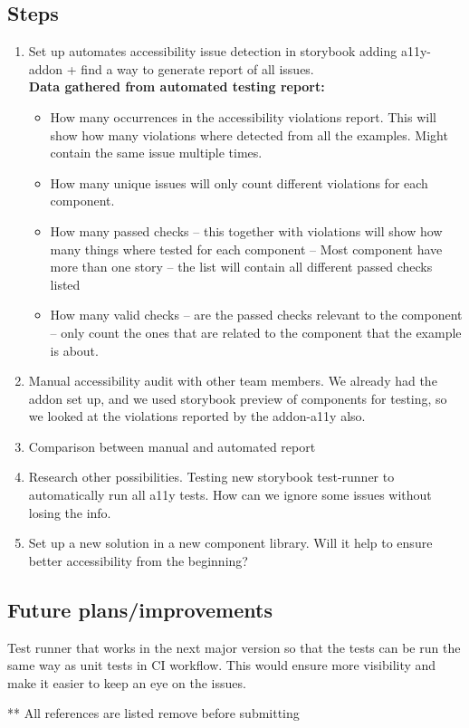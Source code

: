 \documentclass{master_thesis}
\begin{document}
\subsection{Steps}
\begin{enumerate}
	\item Set up automates accessibility issue detection in storybook
	adding a11y-addon + find a way to generate report of all issues. \\
	\textbf{Data gathered from automated testing report:}
	\begin{itemize}
		\item How many occurrences in the accessibility violations report. This will show how many violations where detected from all the examples. Might contain the same issue multiple times.
		\item How many unique issues will only count different violations for each component.
		\item How many passed checks – this together with violations will show how many things where tested for each component – Most component have more than one story – the list will contain all different passed checks listed
		\item How many valid checks – are the passed checks relevant to the component – only count the ones that are related to the component that the example is about.
	\end{itemize}
	\item Manual accessibility audit with other team members. We already had the addon set up, and we used storybook preview of components for testing, so we looked at the violations reported by the addon-a11y also.
	\item Comparison between manual and automated report
	\item Research other possibilities. Testing new storybook test-runner to automatically run all a11y tests. How can we ignore some issues without losing the info.
	\item Set up a new solution in a new component library. Will it help to ensure better accessibility from the beginning?
\end{enumerate}

\subsection{Future plans/improvements}
Test runner that works in the next major version so that the tests can be run the same way as unit tests in CI workflow. This would ensure more visibility and make it easier to keep an eye on the issues.

\pagebreak
** All references are listed remove before submitting
\nocite{*}
\printbibliography
\end{document}
